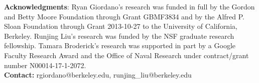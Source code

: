 \documentclass[a0,plainsections]{sciposter}\usepackage[]{graphicx}\usepackage[]{color}
\begin{document}
\begin{center}
\begin{minipage}[t]{\textwidth}

{\bf Acknowledgments}:
Ryan Giordano's research was funded in full by the
Gordon and Betty Moore Foundation through Grant GBMF3834 and by the Alfred P. Sloan Foundation through Grant 2013-10-27 to the University of California, Berkeley. Runjing Liu's research was funded by the NSF graduate research fellowship. Tamara Broderick's research was supported in part by a Google Faculty Research Award and the Office of Naval Research under contract/grant number N00014-17-1-2072.\\
{\bf Contact: } rgiordano@berkeley.edu, runjing\_liu@berkeley.edu
\end{minipage}
\end{center}
\end{document}
